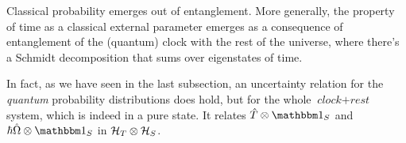 Classical probability emerges out of entanglement. More generally,
the property of time as a classical external parameter emerges as
a consequence of entanglement of the (quantum) clock
with the rest of the universe, where there's a Schmidt decomposition
that sums over eigenstates of time.

In fact, as we have seen in the last subsection,
an uncertainty relation for the \emph{quantum} probability distributions does hold,
but for the whole
$\textit{clock} + \textit{rest}$ system, which is indeed in a pure state.
It relates $\hat{T}\ox\idop_S$ and $\hbar\hat{\Omega}\ox\idop_S$
in $\mathcal{H}_T \otimes \mathcal{H}_S$.